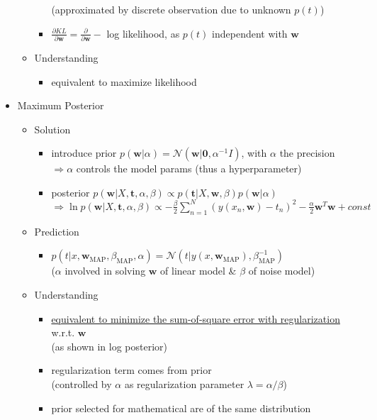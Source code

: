 \begin{itemize}
\begin{itemize}
\begin{itemize}
		(approximated by discrete observation due to unknown $p(t)$)
		\item $\frac{\partial KL}{\partial \mathbf w} = \frac{\partial}{\partial \mathbf w} - $ log likelihood, as $p(t)$ independent with $\mathbf w$
		\end{itemize}
	\item Understanding
		\begin{itemize}
		\item equivalent to maximize likelihood
		\end{itemize}
	\end{itemize}
\item Maximum Posterior
	\begin{itemize}
	\item Solution
		\begin{itemize}
		\item introduce prior $p(\mathbf w|\alpha)= \mathcal{N}(\mathbf w|\mathbf 0,\alpha^{-1}I)$, with $\alpha$ the precision \\
		$\Rightarrow \alpha$ controls the model params (thus a hyperparameter)
		\item posterior $p(\mathbf w|X, \mathbf t, \alpha, \beta)\propto p(\mathbf t|X, \mathbf w, \beta)p(\mathbf w|\alpha)$ \\
		$\displaystyle \Rightarrow \ln p(\mathbf w|X, \mathbf t, \alpha, \beta) \propto -\frac \beta 2 \sum_{n=1}^N (y(x_n, \mathbf w)-t_n)^2 - \frac \alpha 2 \mathbf w^T\mathbf w + const$
		\end{itemize}
	\item Prediction
		\begin{itemize}
		\item $p(t|x,\mathbf w_\text{MAP}, \beta_\text{MAP}, \alpha) = \mathcal N(t|y(x, \mathbf w_\text{MAP}), \beta^{-1}_\text{MAP})$ \\
		($\alpha$ involved in solving $\mathbf w$ of linear model \& $\beta$ of noise model)
		\end{itemize}
	\item Understanding
		\begin{itemize}
		\item \underline{equivalent to minimize the sum-of-square error with regularization} w.r.t. $\mathbf w$ \\
		(as shown in log posterior)
		\item regularization term comes from prior \\ 
		(controlled by $\alpha$ as regularization parameter $\lambda=\alpha/\beta$)
		\item prior selected for mathematical are of the same distribution
		\end{itemize}
	\end{itemize}
		

\end{itemize}
